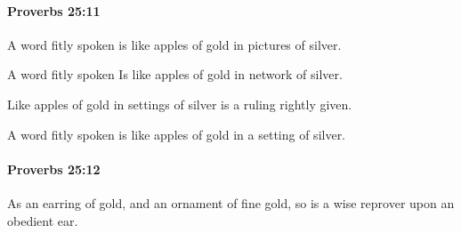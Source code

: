 		\paragraph{Proverbs 25:11} %
			\label{PROVERBS-25-11}

			A word fitly spoken is like apples of gold in pictures of silver.

			\begin{versebox}
					\item[BHS] 
					\item[ASV] A word fitly spoken Is like apples of gold in network of silver.
					\item[NIV] Like apples of gold in settings of silver is a ruling rightly given.
					\item[NRSV] A word fitly spoken is like apples of gold in a setting of silver.
			\end{versebox}

		\paragraph{Proverbs 25:12} %
			\label{PROVERBS-25-12}

			As an earring of gold, and an ornament of fine gold, so is a wise reprover upon an obedient ear.

